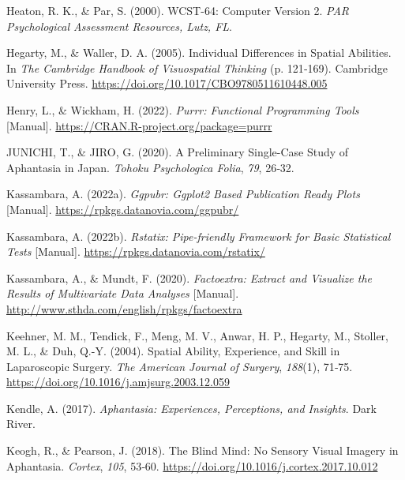 \documentclass[
  12pt,
]{article}
\newlength{\cslhangindent}
\newlength{\cslentryspacingunit} %
\newenvironment{CSLReferences}[2] %
 {%
  \setlength{\parindent}{0pt}
  \ifodd #1
  \let\oldpar\par
  \def\par{\hangindent=\cslhangindent\oldpar}
  \fi
  \setlength{\parskip}{#2\cslentryspacingunit}
 }%
 {}
\begin{document}
\begin{CSLReferences}{1}{0}
\leavevmode{}%
Heaton, R. K., \& Par, S. (2000). {WCST-64}: Computer Version 2.
\emph{PAR Psychological Assessment Resources, Lutz, FL}.

\leavevmode{}%
Hegarty, M., \& Waller, D. A. (2005). Individual {Differences} in
{Spatial Abilities}. In \emph{The {Cambridge Handbook} of {Visuospatial
Thinking}} (p. 121‑169). {Cambridge University Press}.
\url{https://doi.org/10.1017/CBO9780511610448.005}

\leavevmode{}%
Henry, L., \& Wickham, H. (2022). \emph{Purrr: {Functional} Programming
Tools} {[}Manual{]}. \url{https://CRAN.R-project.org/package=purrr}

\leavevmode{}%
JUNICHI, T., \& JIRO, G. (2020). A Preliminary Single-Case Study of
Aphantasia in {Japan}. \emph{Tohoku Psychologica Folia}, \emph{79},
26‑32.

\leavevmode{}%
Kassambara, A. (2022a). \emph{Ggpubr: Ggplot2 Based Publication Ready
Plots} {[}Manual{]}. \url{https://rpkgs.datanovia.com/ggpubr/}

\leavevmode{}%
Kassambara, A. (2022b). \emph{Rstatix: {Pipe-friendly} Framework for
Basic Statistical Tests} {[}Manual{]}.
\url{https://rpkgs.datanovia.com/rstatix/}

\leavevmode{}%
Kassambara, A., \& Mundt, F. (2020). \emph{Factoextra: {Extract} and
Visualize the Results of Multivariate Data Analyses} {[}Manual{]}.
\url{http://www.sthda.com/english/rpkgs/factoextra}

\leavevmode{}%
Keehner, M. M., Tendick, F., Meng, M. V., Anwar, H. P., Hegarty, M.,
Stoller, M. L., \& Duh, Q.-Y. (2004). Spatial Ability, Experience, and
Skill in Laparoscopic Surgery. \emph{The American Journal of Surgery},
\emph{188}(1), 71‑75.
\url{https://doi.org/10.1016/j.amjsurg.2003.12.059}

\leavevmode{}%
Kendle, A. (2017). \emph{Aphantasia: {Experiences}, Perceptions, and
Insights}. {Dark River}.

\leavevmode{}%
Keogh, R., \& Pearson, J. (2018). The Blind Mind: {No} Sensory Visual
Imagery in Aphantasia. \emph{Cortex}, \emph{105}, 53‑60.
\url{https://doi.org/10.1016/j.cortex.2017.10.012}


\end{CSLReferences}
\end{document}
